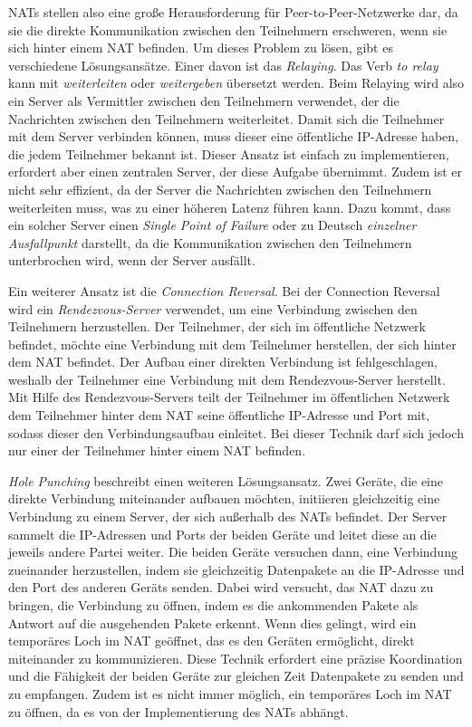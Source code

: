 NATs stellen also eine große Herausforderung für Peer-to-Peer-Netzwerke dar, da sie die direkte Kommunikation zwischen den Teilnehmern erschweren, wenn sie sich hinter einem NAT befinden. Um dieses Problem zu lösen, gibt es verschiedene Lösungsansätze. Einer davon ist das \textit{Relaying}. Das Verb \textit{to relay} kann mit \textit{weiterleiten} oder \textit{weitergeben} übersetzt werden. Beim Relaying wird also ein Server als Vermittler zwischen den Teilnehmern verwendet, der die Nachrichten zwischen den Teilnehmern weiterleitet. Damit sich die Teilnehmer mit dem Server verbinden können, muss dieser eine öffentliche IP-Adresse haben, die jedem Teilnehmer bekannt ist. Dieser Ansatz ist einfach zu implementieren, erfordert aber einen zentralen Server, der diese Aufgabe übernimmt. Zudem ist er nicht sehr effizient, da der Server die Nachrichten zwischen den Teilnehmern weiterleiten muss, was zu einer höheren Latenz führen kann. Dazu kommt, dass ein solcher Server einen \textit{Single Point of Failure} oder zu Deutsch \textit{einzelner Ausfallpunkt} darstellt, da die Kommunikation zwischen den Teilnehmern unterbrochen wird, wenn der Server ausfällt.

Ein weiterer Ansatz ist die \textit{Connection Reversal}. Bei der Connection Reversal wird ein \textit{Rendezvous-Server} verwendet, um eine Verbindung zwischen den Teilnehmern herzustellen. Der Teilnehmer, der sich im öffentliche Netzwerk befindet, möchte eine Verbindung mit dem Teilnehmer herstellen, der sich hinter dem NAT befindet. Der Aufbau einer direkten Verbindung ist fehlgeschlagen, weshalb der Teilnehmer eine Verbindung mit dem Rendezvous-Server herstellt. Mit Hilfe des Rendezvous-Servers teilt der Teilnehmer im öffentlichen Netzwerk dem Teilnehmer hinter dem NAT seine öffentliche IP-Adresse und Port mit, sodass dieser den Verbindungsaufbau einleitet. Bei dieser Technik darf sich jedoch nur einer der Teilnehmer hinter einem NAT befinden.

\textit{Hole Punching} beschreibt einen weiteren Lösungsansatz. Zwei Geräte, die eine direkte Verbindung miteinander aufbauen möchten, initiieren gleichzeitig eine Verbindung zu einem Server, der sich außerhalb des NATs befindet. Der Server sammelt die IP-Adressen und Ports der beiden Geräte und leitet diese an die jeweils andere Partei weiter. Die beiden Geräte versuchen dann, eine Verbindung zueinander herzustellen, indem sie gleichzeitig Datenpakete an die IP-Adresse und den Port des anderen Geräts senden. Dabei wird versucht, das NAT dazu zu bringen, die Verbindung zu öffnen, indem es die ankommenden Pakete als Antwort auf die ausgehenden Pakete erkennt. Wenn dies gelingt, wird ein temporäres Loch im NAT geöffnet, das es den Geräten ermöglicht, direkt miteinander zu kommunizieren. Diese Technik erfordert eine präzise Koordination und die Fähigkeit der beiden Geräte zur gleichen Zeit Datenpakete zu senden und zu empfangen. Zudem ist es nicht immer möglich, ein temporäres Loch im NAT zu öffnen, da es von der Implementierung des NATs abhängt. 

